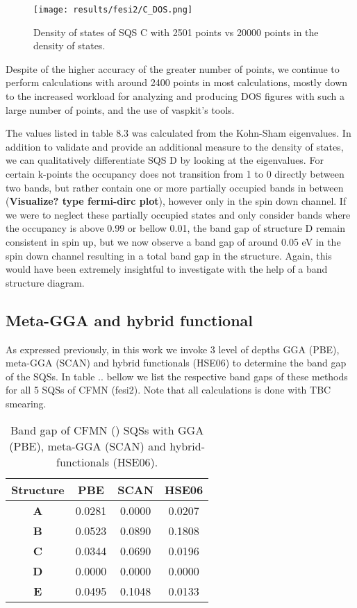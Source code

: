 \begin{figure}[H]
	\texttt{[image: results/fesi2/C\_DOS.png]}
	\caption{Density of states of SQS C with 2501 points vs 20000 points in the density of states.}
\end{figure} 

Despite of the higher accuracy of the greater number of points, we continue to perform calculations with around 2400 points in most calculations, mostly down to the increased workload for analyzing and producing DOS figures with such a large number of points, and the use of vaspkit's tools. 
 
The values listed in table 8.3 was calculated from the Kohn-Sham eigenvalues. In addition to validate and provide an additional measure to the density of states, we can qualitatively differentiate SQS D by looking at the eigenvalues. For certain k-points the occupancy does not transition from 1 to 0 directly between two bands, but rather contain one or more partially occupied bands in between (\textbf{Visualize? type fermi-dirc plot}), however only in the spin down channel. If we were to neglect these partially occupied states and only consider bands where the occupancy is above 0.99 or bellow 0.01, the band gap of structure D remain consistent in spin up, but we now observe a band gap of around 0.05 eV in the spin down channel resulting in a total band gap in the structure. Again, this would have been extremely insightful to investigate with the help of a band structure diagram.

\subsection{Meta-GGA and hybrid functional}

As expressed previously, in this work we invoke 3 level of depths GGA (PBE), meta-GGA (SCAN) and hybrid functionals (HSE06) to determine the band gap of the SQSs. In table .. bellow we list the respective band gaps of these methods for all 5 SQSs of CFMN (fesi2). Note that all calculations is done with TBC smearing.

\begin{table}[H]
\centering
\begin{tabular}{@{}cccc@{}}
\toprule
Structure  & PBE    & SCAN   & HSE06  \\ \midrule
\textbf{A} & 0.0281 & 0.0000 & 0.0207 \\
\textbf{B} & 0.0523 & 0.0890 & 0.1808 \\
\textbf{C} & 0.0344 & 0.0690 & 0.0196 \\
\textbf{D} & 0.0000 & 0.0000 & 0.0000 \\
\textbf{E} & 0.0495 & 0.1048 & 0.0133 \\ \bottomrule
\end{tabular}
\caption{Band gap of CFMN () SQSs with GGA (PBE), meta-GGA (SCAN) and hybrid-functionals (HSE06).}
\end{table}

